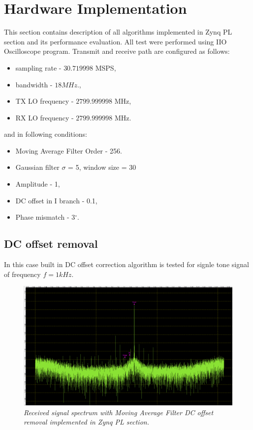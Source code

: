 \documentclass[en,printmode]{mgr}
\begin{document}
	\section{Hardware Implementation}
		This section contains description of all algorithms implemented in Zynq PL section and its 
		performance evaluation.
		All test were performed using IIO Oscilloscope program.
		Transmit and receive path are configured as follows:
		\begin{itemize}
			\item sampling rate - $30.719998$ MSPS,
			\item bandwidth - $18MHz$.,
			\item TX LO frequency - $2799.999998$ MHz,
			\item RX LO frequency - $2799.999998$ MHz.
		\end{itemize}
		and in following conditions:
		\begin{itemize}
			\item Moving Average Filter Order - 256.
			\item Gaussian filter $\sigma$ = 5, window size = 30
			\item Amplitude - 1,
			\item DC offset in I branch - 0.1,
			\item Phase mismatch - 3$^\circ$.
		\end{itemize}
	\newpage
	 \subsection*{DC offset removal}
	 	In this case built in DC offset correction algorithm is tested for signle tone
		signal of frequency $f=1kHz$.
	 	\begin{figure}[H]
    		\centering
   			\includegraphics[width=\textwidth]{plots/my_dc.png}
   		 	\caption{\textit{Received signal spectrum with Moving Average Filter DC offset removal
   		 	implemented in Zynq PL section.}}
   		\end{figure}
   		
\end{document}
